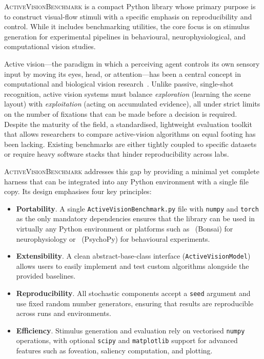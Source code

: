 \documentclass[12pt,a4paper]{article}
\newcommand{\avb}{\textsc{ActiveVisionBenchmark}}  %
\begin{document}
\avb{} is a compact Python library whose primary purpose is to construct visual-flow stimuli with a specific emphasis on reproducibility and control. While it includes benchmarking utilities, the core focus is on stimulus generation for experimental pipelines in behavioural, neurophysiological, and computational vision studies.

Active vision---the paradigm in which a perceiving agent controls its own sensory input by moving its eyes, head, or attention---has been a central concept in computational and biological vision research~\parencite{Bajcsy1988,Yarbus1967,Tatler2011}. Unlike passive, single-shot recognition, active vision systems must balance \emph{exploration} (learning the scene layout) with \emph{exploitation} (acting on accumulated evidence), all under strict limits on the number of fixations that can be made before a decision is required. Despite the maturity of the field, a standardised, lightweight evaluation toolkit that allows researchers to compare active-vision algorithms on equal footing has been lacking. Existing benchmarks are either tightly coupled to specific datasets~\parencite{Judd2009,Kummerer2016} or require heavy software stacks that hinder reproducibility across labs.

\avb{} addresses this gap by providing a minimal yet complete harness that can be integrated into any Python environment with a single file copy. Its design emphasises four key principles:

\begin{itemize}
  \item \textbf{Portability}. A single \texttt{ActiveVisionBenchmark.py} file with \texttt{numpy} and \texttt{torch} as the only mandatory dependencies ensures that the library can be used in virtually any Python environment or platforms such as~\textcite{Lopez2019} (Bonsai) for neurophysiology or~\textcite{Peirce2019} (PsychoPy) for behavioural experiments.

  \item \textbf{Extensibility}. A clean abstract-base-class interface (\texttt{ActiveVisionModel}) allows users to easily implement and test custom algorithms alongside the provided baselines.

  \item \textbf{Reproducibility}. All stochastic components accept a \texttt{seed} argument and use fixed random number generators, ensuring that results are reproducible across runs and environments.

  \item \textbf{Efficiency}. Stimulus generation and evaluation rely on vectorised \texttt{numpy} operations, with optional \texttt{scipy} and \texttt{matplotlib} support for advanced features such as foveation, saliency computation, and plotting.
\end{itemize}
\end{document}
